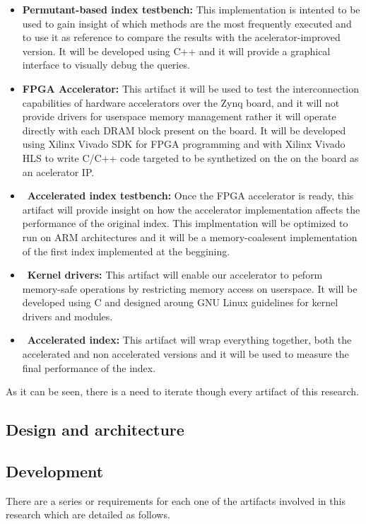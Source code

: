 \begin{itemize}
    \item {\textbf{Permutant-based index testbench:} This implementation is intented to be used to gain insight of which methods are the most frequently
    executed and to use it as reference to compare the results with the acelerator-improved version. It will be developed using C++ and it will provide 
    a graphical interface to visually debug the queries.}
    \item {\textbf{FPGA Accelerator:} This artifact it will be used to test the interconnection capabilities of hardware accelerators over the Zynq board,
    and it will not provide drivers for userspace memory management rather it will operate directly with each DRAM block present on the board. It will be 
    developed using Xilinx Vivado SDK for FPGA programming and with Xilinx Vivado HLS to write C/C++ code targeted to be synthetized on the on the board
    as an acelerator IP.}
    \item {\textbf{Accelerated index testbench:} Once the FPGA accelerator is ready, this artifact will provide insight on how the accelerator implementation affects
    the performance of the original index. This implmentation will be optimized to run on ARM architectures and it will be a memory-coalesent implementation
    of the first index implemented at the beggining.}
    \item {\textbf{Kernel drivers:} This artifact will enable our accelerator to peform memory-safe operations by restricting memory access on userspace.
    It will be developed using C and designed aroung GNU Linux guidelines for kernel drivers and modules.}
    \item {\textbf{Accelerated index:} This artifact will wrap everything together, both the accelerated and non accelerated versions and it will be used
    to measure the final performance of the index.}
\end{itemize}

As it can be seen, there is a need to iterate though every artifact of this research.

\subsection{Design and architecture}
\subsection{Development}
There are a series or requirements for each one of the artifacts involved in this research which are detailed as follows.

